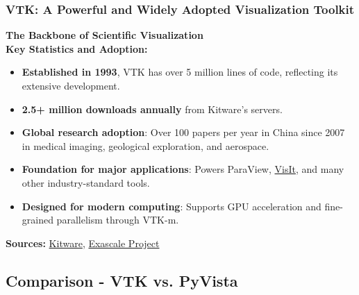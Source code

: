 \documentclass[t]{beamer}
\renewcommand{\normalsize}{\small}
\renewcommand{\small}{\footnotesize}
\renewcommand{\footnotesize}{\scriptsize}
\renewcommand{\normalsize}{\fontsize{9pt}{11pt}\selectfont}
\begin{document}
\begin{frame}
    \frametitle{VTK: A Powerful and Widely Adopted Visualization Toolkit}

    \centering
    \Large
    \textbf{The Backbone of Scientific Visualization} \\[10pt]

    \normalsize
    \textbf{Key Statistics and Adoption:} \\[10pt]

    \begin{itemize}[leftmargin=10pt, label=•]
        \item \textbf{Established in 1993}, VTK has over 5 million lines of code, reflecting its extensive development.
        \item \textbf{2.5+ million downloads annually} from Kitware’s servers.
        \item \textbf{Global research adoption}: Over 100 papers per year in China since 2007 in medical imaging, geological exploration, and aerospace.
        \item \textbf{Foundation for major applications}: Powers ParaView, \href{https://en.wikipedia.org/wiki/VisIt}{VisIt}, and many other industry-standard tools.
        \item \textbf{Designed for modern computing}: Supports GPU acceleration and fine-grained parallelism through VTK-m.
    \end{itemize}

    \vspace{10pt}
    \textbf{Sources:} \href{https://www.kitware.com/happy-birthday-vtk-30-years-of-innovation/}{Kitware}, \href{https://www.exascaleproject.org/highlight/ecp-brings-much-needed-visualization-software-to-exascale-and-gpu-accelerated-systems/}{Exascale Project}

\end{frame}

\subsection{Comparison - VTK vs. PyVista}
\end{document}
